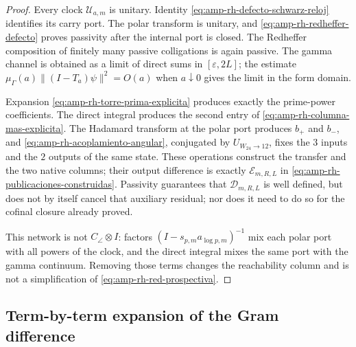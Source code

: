 \begin{proof}
Every clock \(\mathscr U_{a,m}\) is unitary. Identity \eqref{eq:amp-rh-defecto-schwarz-reloj} identifies its carry port. The polar transform is unitary, and \eqref{eq:amp-rh-redheffer-defecto} proves passivity after the internal port is closed. The Redheffer composition of finitely many passive colligations is again passive. The gamma channel is obtained as a limit of direct sums in \([\varepsilon,2L]\); the estimate \(\mu_\Gamma(a)\|(I-T_a)\psi\|^2=O(a)\) when \(a\downarrow0\) gives the limit in the form domain.

Expansion \eqref{eq:amp-rh-torre-prima-explicita} produces exactly the prime-power coefficients. The direct integral produces the second entry of \eqref{eq:amp-rh-columna-mas-explicita}. The Hadamard transform at the polar port produces \(b_+\) and \(b_-\), and \eqref{eq:amp-rh-acoplamiento-angular}, conjugated by \(U_{W_{24}\to12}\), fixes the \(3\) inputs and the \(2\) outputs of the same state. These operations construct the transfer and the two native columns; their output difference is exactly \(\mathcal E_{m,R,L}\) in \eqref{eq:amp-rh-publicaciones-construidas}. Passivity guarantees that \(\mathscr D_{m,R,L}\) is well defined, but does not by itself cancel that auxiliary residual; nor does it need to do so for the cofinal closure already proved.

This network is not \(C_\angle\otimes I\): factors \((I-s_{p,m}a_{\log p,m})^{-1}\) mix each polar port with all powers of the clock, and the direct integral mixes the same port with the gamma continuum. Removing those terms changes the reachability column and is not a simplification of \eqref{eq:amp-rh-red-prospectiva}.
\end{proof}

\subsection*{Term-by-term expansion of the Gram difference}

